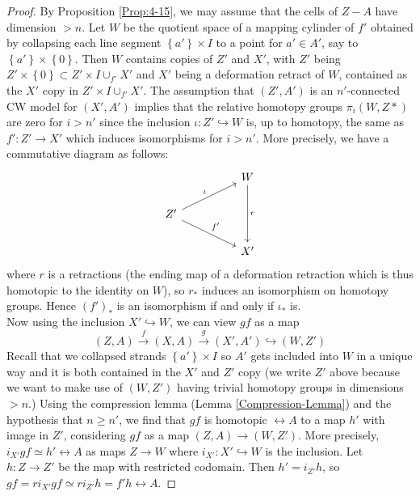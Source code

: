 \begin{proof}
    By Proposition \ref{Prop:4-15}, we may assume
    that the cells of $Z- A$ have dimension
    $>n$. Let
    $W$ be the quotient space of a mapping cylinder
    of $f'$ obtained by collapsing each line segment
    $\left\{ a' \right\} \times I$ to a point for
    $a' \in A'$, say to 
    $\left\{ a' \right\} \times \left\{ 0 \right\} $.
    Then $W$ contains copies of $Z'$ and $X'$, with
    $Z'$ being $Z' \times \left\{ 0 \right\} 
    \subset Z' \times I \cup_{f'} X'$ and
    $X'$ being a deformation retract of
    $W$, contained as the $X'$ copy in
    $Z' \times I \cup_{f'} X'$. The
    assumption that $(Z',A')$ is an $n'$-connected
    CW model for $(X',A')$ implies that
    the relative homotopy groups $\pi_i (W,Z*)$ are 
    zero for $i>n'$ since
    the inclusion
    $\iota \colon Z' \hookrightarrow W$ is,
    up to homotopy, the same as
    $f' \colon Z' \to X'$ which
    induces isomorphisms for
    $i>n'$. More precisely, we have a commutative diagram
    as follows:
    \begin{equation*}
    \begin{tikzcd}
        & & W \ar[dd, "r"] \\
        Z' \ar[rru, "\iota"] \ar[drr, "f'"] & &\\
                             & & X'
    \end{tikzcd}
    \end{equation*}
    where $r$ is a retractions (the ending map of a 
    deformation retraction which is thus homotopic
    to the identity on $W$), so $r_*$ induces
    an isomorphism on homotopy groups. Hence
    $\left( f' \right)_* $ is an isomorphism if
    and only if $\iota_*$ is.\\
    Now using the
    inclusion $X' \hookrightarrow W$, we can view
    $gf$ as a map
    \[
        \left( Z,A \right) \stackrel{f}{\to} (X,A)
        \stackrel{g}{\to} \left( X',A' \right)
        \hookrightarrow \left( W,Z' \right) 
    \] 
    Recall that we collapsed strands
    $\left\{ a' \right\} \times I$ so
    $A'$ gets included into
    $W$ in a unique way and it is both contained
    in the $X'$ and $Z'$ copy (we write
    $Z'$ above because we want to make use
    of $(W,Z')$ having trivial homotopy
    groups in dimensions $>n$.)
    Using the compression lemma (Lemma \ref{Compression-Lemma})
    and the hypothesis that $n\ge n'$, we
    find that $gf$ is homotopic $\rel A$ to a map
    $h'$ with image in $Z'$, considering
    $gf$ as a map
    $\left( Z,A \right) \to (W,Z')$.
    More precisely, $i_{X'} gf \simeq h' \rel A$ as
    maps $Z \to W$ where
    $i_{X'} \colon X' \hookrightarrow W$ is the inclusion.
    Let $h \colon Z \to Z'$ be the map with restricted
    codomain. Then $h' = i_{Z'} h$, so
    $gf = r i_{X'} gf \simeq r i_{Z'} h 
    = f' h \rel A$.


\end{proof}
